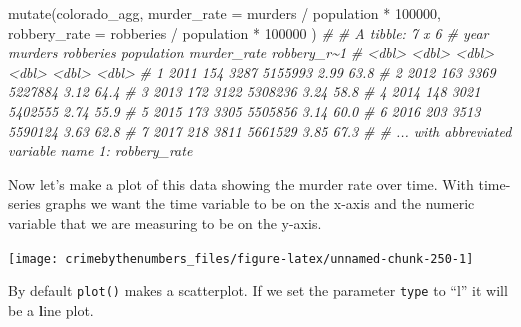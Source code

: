 \documentclass[
  a4paper,
]{krantz}
\makeatletter
\newenvironment{Shaded}{\begin{snugshade}}{\end{snugshade}}
\newcommand{\AttributeTok}[1]{\textcolor[rgb]{0.77,0.63,0.00}{#1}}
\newcommand{\CommentTok}[1]{\textcolor[rgb]{0.56,0.35,0.01}{\textit{#1}}}
\newcommand{\DecValTok}[1]{\textcolor[rgb]{0.00,0.00,0.81}{#1}}
\newcommand{\FunctionTok}[1]{\textcolor[rgb]{0.00,0.00,0.00}{#1}}
\newcommand{\NormalTok}[1]{#1}
\newcommand{\SpecialCharTok}[1]{\textcolor[rgb]{0.00,0.00,0.00}{#1}}
\newenvironment{kframe}{%
\medskip{}
\setlength{\fboxsep}{.8em}
 \def\at@end@of@kframe{}%
 \ifinner\ifhmode%
  \def\at@end@of@kframe{\end{minipage}}%
  \begin{minipage}{\columnwidth}%
 \fi\fi%
 \def\FrameCommand##1{\hskip\@totalleftmargin \hskip-\fboxsep
 \colorbox{shadecolor}{##1}\hskip-\fboxsep
     \hskip-\linewidth \hskip-\@totalleftmargin \hskip\columnwidth}%
 \MakeFramed {\advance\hsize-\width
   \@totalleftmargin\z@ \linewidth\hsize
   \@setminipage}}%
 {\par\unskip\endMakeFramed%
 \at@end@of@kframe}
\renewenvironment{Shaded}{\begin{kframe}}{\end{kframe}}
\makeatother
\begin{document}
\begin{Shaded}
\begin{Highlighting}[]
\FunctionTok{mutate}\NormalTok{(colorado\_agg,}
  \AttributeTok{murder\_rate  =}\NormalTok{ murders }\SpecialCharTok{/}\NormalTok{ population }\SpecialCharTok{*} \DecValTok{100000}\NormalTok{,}
  \AttributeTok{robbery\_rate =}\NormalTok{ robberies }\SpecialCharTok{/}\NormalTok{ population }\SpecialCharTok{*} \DecValTok{100000}
\NormalTok{)}
\CommentTok{\# \# A tibble: 7 x 6}
\CommentTok{\#    year murders robberies population murder\_rate robbery\_r\textasciitilde{}1}
\CommentTok{\#   \textless{}dbl\textgreater{}   \textless{}dbl\textgreater{}     \textless{}dbl\textgreater{}      \textless{}dbl\textgreater{}       \textless{}dbl\textgreater{}       \textless{}dbl\textgreater{}}
\CommentTok{\# 1  2011     154      3287    5155993        2.99        63.8}
\CommentTok{\# 2  2012     163      3369    5227884        3.12        64.4}
\CommentTok{\# 3  2013     172      3122    5308236        3.24        58.8}
\CommentTok{\# 4  2014     148      3021    5402555        2.74        55.9}
\CommentTok{\# 5  2015     173      3305    5505856        3.14        60.0}
\CommentTok{\# 6  2016     203      3513    5590124        3.63        62.8}
\CommentTok{\# 7  2017     218      3811    5661529        3.85        67.3}
\CommentTok{\# \# ... with abbreviated variable name 1: robbery\_rate}
\end{Highlighting}
\end{Shaded}

Now let's make a plot of this data showing the murder rate
over time. With time-series graphs we want the time variable
to be on the x-axis and the numeric variable that we are
measuring to be on the y-axis.

\begin{Shaded}
\end{Shaded}

\begin{center}\texttt{[image: crimebythenumbers\_files/figure-latex/unnamed-chunk-250-1]} \end{center}

By default \texttt{plot()} makes a scatterplot. If we set
the parameter \texttt{type} to ``l'' it will be a
\textbf{l}ine plot.
\end{document}
